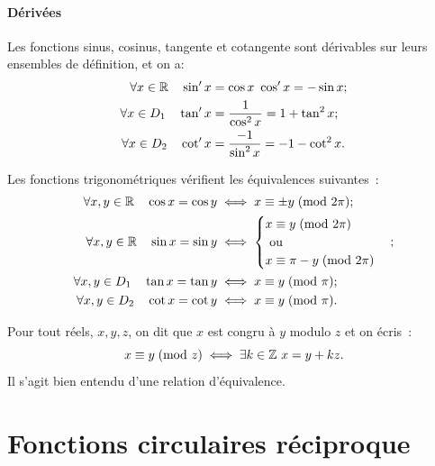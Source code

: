 \paragraph{Dérivées}
Les fonctions sinus, cosinus, tangente et cotangente sont dérivables sur leurs 
ensembles de définition, et on a:
\begin{align}
    \forall x \in \mathbb{R} \quad \sin'x &=\cos x \ \cos'x=-\sin x; \\
    \forall x \in D_1 \quad \tan'x &=\frac{1}{\cos^2 x}=1+\tan^2 x; \\
    \forall x \in D_2 \quad \cot'x &=\frac{-1}{\sin^2 x}=-1-\cot^2 x.
\end{align}
\begin{prop}
    Les fonctions trigonométriques vérifient les équivalences suivantes~:
    \begin{align}        
        \forall x, y \in \mathbb{R} \quad \cos x = \cos y &\iff x \equiv \pm 
        y\!\pmod {2\pi};\\
        \forall x, y \in \mathbb{R} \quad \sin x = \sin y &\iff
        \begin{cases}
            x \equiv y\!\pmod {2\pi} \\ \text{~ou~} \\ x \equiv \pi-y\!\pmod {2\pi}
        \end{cases}; \\
        \forall x, y \in D_1 \quad \tan x = \tan y &\iff x \equiv y\!\pmod {\pi};\\
        \forall x, y \in D_2 \quad \cot x = \cot y &\iff x \equiv y\!\pmod {\pi}.
    \end{align}
\end{prop}
\begin{defdef}[Congruence]
    Pour tout réels, \(x, y, z\), on dit que \(x\) est congru à \(y\) modulo 
    \(z\) et on écris~:
    \begin{equation}
        x \equiv y\!\pmod {z} \iff \exists k \in \mathbb{Z} \ x = y + kz.
    \end{equation}
    Il s'agit bien entendu d'une relation d'équivalence.
\end{defdef}
\section{Fonctions circulaires réciproque}
\label{sec:chap1-fonctionscircréciproques}

